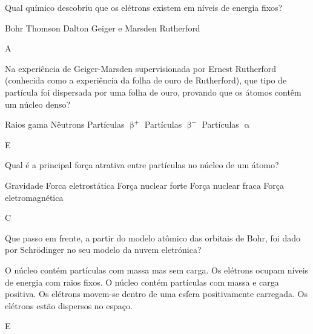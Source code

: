 \documentclass[9qpt]{scrartcl}
\begin{document}
\begin{exercise}[points=1.0]
Qual químico descobriu que os elétrons existem em níveis de energia fixos?
\begin{choice}
\choice Bohr
\choice Thomson
\choice Dalton
\choice Geiger e Marsden
\choice Rutherford
\end{choice}
\end{exercise}
\begin{solution}
A
\end{solution}


\begin{exercise}[points=1.0]
Na experiência de Geiger-Marsden supervisionada por Ernest Rutherford (conhecida como a experiência da folha de ouro de Rutherford), que tipo de partícula foi dispersada por uma folha de ouro, provando que os átomos contêm um núcleo denso?

\begin{choice}
\choice Raios gama
\choice Nêutrons
\choice Partículas \(\upbeta^+\)
\choice Partículas \(\upbeta^-\)
\choice Partículas \(\upalpha\)
\end{choice}
\end{exercise}

\begin{solution}
E
\end{solution}

\begin{exercise}[points=1.0]
Qual é a principal força atrativa entre partículas no núcleo de um átomo?

\begin{choice}
\choice Gravidade
\choice Forca eletrostática
\choice Força nuclear forte
\choice Força nuclear fraca
\choice Força eletromagnética
\end{choice}
\end{exercise}
\begin{solution}
C
\end{solution}

\begin{exercise}[points=1.0]
Que passo em frente, a partir do modelo atômico das orbitais de Bohr, foi dado por Schrödinger no seu modelo da nuvem eletrónica?

\begin{choice}
\choice O núcleo contém partículas com massa mas sem carga.
\choice Os elétrons ocupam níveis de energia com raios fixos.
\choice O núcleo contém partículas com massa e carga positiva.
\choice Os elétrons movem-se dentro de uma esfera positivamente carregada.
\choice Os elétrons estão dispersos no espaço.
\end{choice}
\end{exercise}
\begin{solution}
E
\end{solution}
\end{document}
